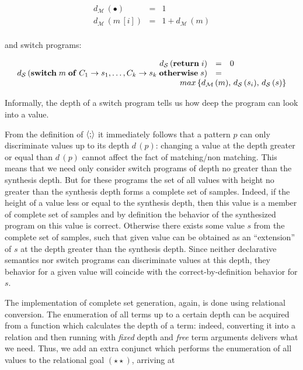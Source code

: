 \[
\begin{array}{rcl}
  d_{\mathcal M}\,(\bullet) & = & 1 \\
  d_{\mathcal M}\,(m\,[i]) & = & 1 + d_{\mathcal M}\,(m)\\
\end{array}
\]

and switch programs:

\[
\begin{array}{rcl}
  d_{\mathcal S}\,(\primi{return}\;i)&=&0\\
  d_{\mathcal S}\,(\primi{switch}\;m\;\primi{of}\;C_1\to s_1,\dots,C_k\to s_k\;\primi{otherwise}\;s)&=&\\
  \multicolumn{3}{c}{\qquad\qquad\qquad\qquad\qquad\qquad\qquad\qquad\qquad\qquad max\,\{d_{\mathcal M}\,(m),\,d_{\mathcal S}\,(s_i),\,d_{\mathcal S}\,(s)\}}
\end{array}
\]

Informally, the depth of a switch program tells us how deep the program can look into a value. 

From the definition of $\left<{;}\right>$ it immediately follows that a pattern $p$ can only discriminate values up to its depth $d\,(p)$: changing a value at the depth greater
or equal than $d\,(p)$ cannot affect the fact of matching/non matching. This means that we need only consider switch programs of depth no greater than the synthesis depth.
But for these programs the set of all values with height no greater than the synthesis depth forms a complete set of samples. Indeed, if the height of a value less or
equal to the synthesis depth, then this value is a member of complete set of samples and by definition the behavior of the synthesized program on this value is
correct. Otherwise there exists some value $s$ from the complete set of samples, such that given value can be obtained as an ``extension'' of $s$ at the
depth greater than the synthesis depth. Since neither declarative semantics nor switch programs can discriminate values at this depth, they behavior for a given value
will coincide with the correct-by-definition behavior for  $s$.

The implementation of complete set generation, again, is done using relational conversion. The enumeration of all terms up to a certain depth
can be acquired from a function which calculates the depth of a term: indeed, converting it into a relation and then running with \emph{fixed} depth
and \emph{free} term arguments delivers what we need. Thus, we add an extra conjunct which performs the enumeration of all values to the
relational goal $(\star\star)$, arriving at

